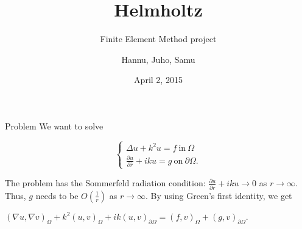 \documentclass{beamer}
\title[Helmholtz]{Helmholtz}
\subtitle{Finite Element Method project}
\author{Hannu, Juho, Samu}
\date{April 2, 2015}
\begin{document}
\begin{frame}
\titlepage
\end{frame}

\begin{frame}{Problem}
We want to solve
\begin{definition}
\[ \begin{cases}
\Delta u + k^2 u = f \ \mathrm{in} \ \Omega \\ \frac{\partial u}{\partial \bar{r}} + iku = g \ \mathrm{on} \ \partial \Omega.
\end{cases} \]
\end{definition}
The problem has the Sommerfeld radiation condition: $\frac{\partial u}{\partial \bar{r}} + iku \rightarrow 0$ as $r \rightarrow \infty$. Thus, $g$ needs to be $O(\frac{1}{r})$ as $r \rightarrow \infty$.
By using Green's first identity, we get \begin{definition}$(\nabla u, \nabla v)_{\Omega} + k^2(u, v)_{\Omega} + ik(u, v)_{\partial \Omega} = (f, v)_{\Omega} + (g, v)_{\partial \Omega}.$
\end{definition}
\end{frame}
\end{document}
